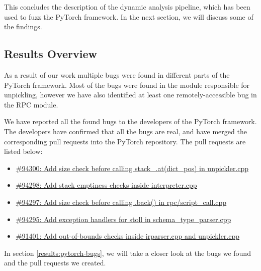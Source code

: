 This concludes the description of the dynamic analysis pipeline, which has been used to fuzz the PyTorch framework. In the next section, we will discuss some of the findings.

\subsection{Results Overview}

As a result of our work multiple bugs were found in different parts of the PyTorch framework. Most of the bugs were found in the module responsible for unpickling, however we have also identified at least one remotely-accessible bug in the RPC module.

We have reported all the found bugs to the developers of the PyTorch framework. The developers have confirmed that all the bugs are real, and have merged the corresponding pull requests into the PyTorch repository. The pull requests are listed below:

\begin{itemize}
    \item \href{https://github.com/pytorch/pytorch/pull/94300}{\#94300: Add size check before calling stack\_.at(dict\_pos) in unpickler.cpp}
    \item \href{https://github.com/pytorch/pytorch/pull/94298}{\#94298: Add stack emptiness checks inside interpreter.cpp}
    \item \href{https://github.com/pytorch/pytorch/pull/94297}{\#94297: Add size check before calling .back() in rpc/script\_call.cpp}
    \item \href{https://github.com/pytorch/pytorch/pull/94295}{\#94295: Add exception handlers for stoll in schema\_type\_parser.cpp}
    \item \href{https://github.com/pytorch/pytorch/pull/91401}{\#91401: Add out-of-bounds checks inside irparser.cpp and unpickler.cpp}
\end{itemize}

In section \ref{results:pytorch-bugs}, we will take a closer look at the bugs we found and the pull requests we created.
